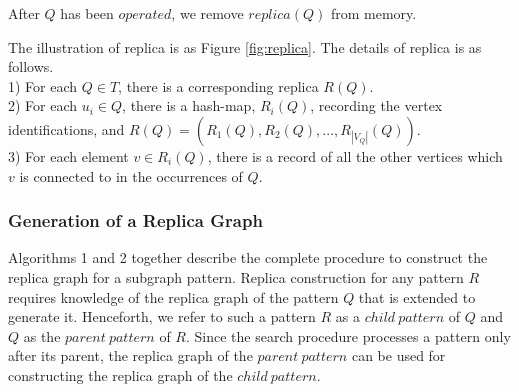 \newline
After $Q$ has been $operated$, we remove $replica(Q)$ from memory.

 The illustration of replica is as Figure \ref{fig:replica}. The details of replica is as follows.\\1) For each $Q\in T$, there is a corresponding replica $R(Q)$.\\2) For each $u_i\in Q$, there is a hash-map, $R_i(Q)$, recording the vertex identifications, and $R(Q)=(R_1(Q), R_2(Q), ..., R_{|V_Q|}(Q))$.\\3) For each element $v\in R_i(Q)$, there is a record of all the other vertices which $v$ is connected to in the occurrences of $Q$.

\subsubsection{Generation of a Replica Graph}
\label{subsubsec:replica-gen}
Algorithms 1 and 2 together describe the complete procedure to construct the replica graph for a subgraph pattern. Replica construction for any pattern $R$ requires knowledge of the replica graph of the pattern $Q$ that is extended to generate it. Henceforth, we refer to such a pattern $R$ as a $child\ pattern$ of $Q$ and $Q$ as the $parent\ pattern$ of $R$. Since the search procedure processes a pattern only after its parent, the replica graph of the $parent\ pattern$ can be used for constructing the replica graph of the $child\ pattern$.

